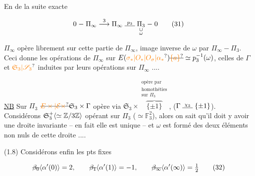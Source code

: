 En  de la suite exacte

\[
0\mathrel{-}\Pi_\infty\mathrel{\overset{3}{\longrightarrow}}\Pi_\infty
\mathrel{\overset{p_3}{\rule{1.5em}{0.4pt}}}
\underset{\substack{\cup\\\omega}}{\Pi_3}\mathrel{-}0
\tag*{(31)}
\]

$\Pi_\infty$ opère librement sur cette partie de $\Pi_\infty$, image inverse de $\omega$ par $\Pi_\infty\mathrel{-}\Pi_3$. Ceci donne les opérations de $\Pi_\infty$ sur $E(\unsure{\sigma_*|O_*|O_{\sigma}|\alpha_*})\deleted{\unsure{\{a\}}}\simeq p_3^{-1}(\omega)$, celles de $\Gamma$ et $\unsure{\mathfrak S_3|\mathscr S_3}$  induites par leurs opérations sur $\Pi_\infty$ ....

\uline{NB} Sur $\Pi_3$ $\deleted{\unsure{E\times|\mathcal E\times}}\mathfrak S_3\times\Gamma$ opère via $\mathfrak S_3\times\overbrace{\{\pm1\}}^{\substack{\text{opère par}\\\text{homothéties}\\\text{sur }\Pi_3}}$, ($\Gamma\mathrel{\overset{\chi_3}{\rule{1.5em}{0.4pt}}}\{\pm1\}$). Considérons $\mathfrak S_3^+\inserted{\simeq\mathbb Z/3\mathbb Z}$ opérant sur $\Pi_3$ ($\simeq\mathbb F_3^2$), alors on sait qu'il doit y avoir une droite invariante --  en fait elle est unique -- et $\omega$ est formé des deux éléments non nuls de cette droite ....


(1.8) Considérons enfin les pts fixes

\[
\deleted{\beta_0}\inserted{\alpha'(0)}=2,\qquad
\deleted{\beta_1}\inserted{\alpha'(1)}=-1,\qquad
\deleted{\beta_\infty}\inserted{\alpha'(\infty)}=\tfrac12
\tag*{(32)}
\]


